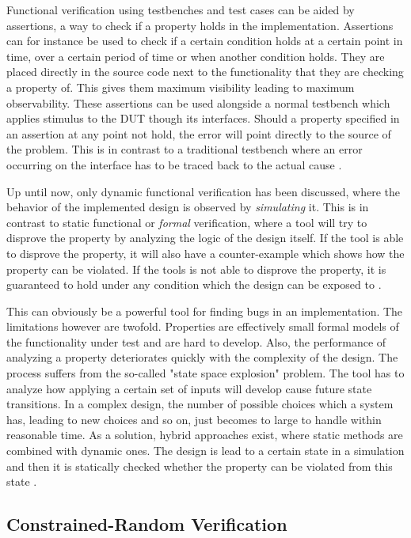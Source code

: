 Functional verification using testbenches and test cases can be aided by assertions, a way to check if a property
holds in the implementation. Assertions can for instance be used to check if a certain condition holds at a certain
point in time, over a certain period of time or when another condition holds. They are placed directly in the source
code next to the functionality that they are checking a property of. This gives them maximum visibility leading to
maximum observability. These assertions can be used alongside a normal testbench which applies stimulus to the DUT
though its interfaces. Should a property specified in an assertion at any point not hold, the error will point
directly to the source of the problem. This is in contrast to a traditional testbench where an error occurring on the
interface has to be traced back to the actual cause \cite[Ch. 14]{mehta2021introduction}.

Up until now, only dynamic functional verification has been discussed, where the behavior of the implemented design
is observed by \textit{simulating} it. This is in contrast to static functional or \textit{formal} verification,
where a tool will try to disprove the property by analyzing the logic of the design itself. If the tool is able to
disprove the property, it will also have a counter-example which shows how the property can be violated. If the tools
is not able to disprove the property, it is guaranteed to hold under any condition which the design can be exposed to
\cite[Ch. 14]{mehta2021introduction}.

This can obviously be a powerful tool for finding bugs in an implementation. The limitations however are twofold.
Properties are effectively small formal models of the functionality under test and are hard to develop. Also, the
performance of analyzing a property deteriorates quickly with the complexity of the design. The process suffers from
the so-called "state space explosion" problem. The tool has to analyze how applying a certain set of inputs will
develop cause future state transitions. In a complex design, the number of possible choices which a system has,
leading to new choices and so on, just becomes to large to handle within reasonable time. As a solution, hybrid
approaches exist, where static methods are combined with dynamic ones. The design is lead to a certain state in a
simulation and then it is statically checked whether the property can be violated from this state \cite[Ch.
14]{mehta2021introduction}.

\subsection{Constrained-Random Verification} %


